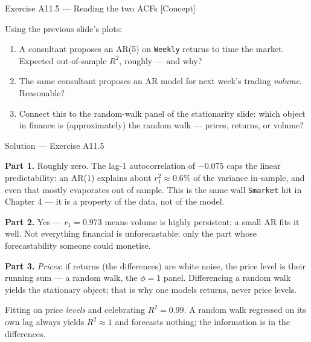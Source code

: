 \documentclass[aspectratio=169,11pt]{beamer}
\begin{document}
\begin{frame}{Exercise A11.5 --- Reading the two ACFs [Concept]}
  \begin{exercise}
    Using the previous slide's plots:
    \begin{enumerate}
      \item A consultant proposes an AR(5) on \texttt{Weekly} returns to time the
            market. Expected out-of-sample $R^2$, roughly --- and why?
      \item The same consultant proposes an AR model for next week's trading
            \emph{volume}. Reasonable?
      \item Connect this to the random-walk panel of the stationarity slide: which
            object in finance is (approximately) the random walk --- prices,
            returns, or volume?
    \end{enumerate}
  \end{exercise}
\end{frame}

\begin{frame}{Solution --- Exercise A11.5}
  \begin{solutionbox}
    \footnotesize
    \textbf{Part 1.} Roughly zero. The lag-1 autocorrelation of $-0.075$ caps the
    linear predictability: an AR(1) explains about $r_1^2 \approx 0.6\%$ of the
    variance in-sample, and even that mostly evaporates out of sample. This is the
    same wall \texttt{Smarket} hit in Chapter 4 --- it is a property of the data,
    not of the model.
    \par\smallskip
    \textbf{Part 2.} Yes --- $r_1 = 0.973$ means volume is highly persistent;
    a small AR fits it well. Not everything financial is unforecastable: only the
    part whose forecastability someone could monetise.
    \par\smallskip
    \textbf{Part 3.} \emph{Prices}: if returns (the differences) are white noise,
    the price level is their running sum --- a random walk, the $\phi = 1$ panel.
    Differencing a random walk yields the stationary object; that is why one
    models returns, never price levels.
  \end{solutionbox}
  \begin{mistake}
    Fitting on price \emph{levels} and celebrating $R^2 = 0.99$. A random walk
    regressed on its own lag always yields $R^2 \approx 1$ and forecasts nothing;
    the information is in the differences.
  \end{mistake}
\end{frame}
\end{document}
